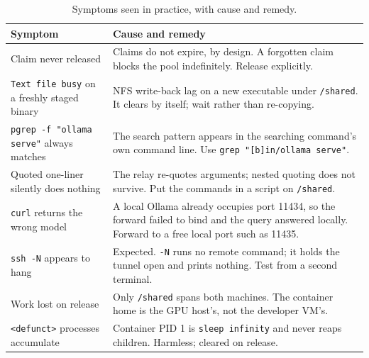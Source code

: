 \documentclass[11pt,a4paper]{article}
\newcommand{\cmd}[1]{\texttt{\small #1}}
\begin{document}
\begin{table}[!ht]
  \centering
  \renewcommand{\arraystretch}{1.25}
  \begin{tabularx}{\linewidth}{@{}>{\raggedright\arraybackslash}p{4.4cm} X@{}}
    \toprule
    \textbf{Symptom} & \textbf{Cause and remedy} \\\midrule
    Claim never released &
    Claims do not expire, by design. A forgotten claim blocks the pool
    indefinitely. Release explicitly. \\[2pt]

    \cmd{Text file busy} on a freshly staged binary &
    NFS write-back lag on a new executable under \cmd{/shared}. It clears by
    itself; wait rather than re-copying. \\[2pt]

    \cmd{pgrep -f "ollama serve"} always matches &
    The search pattern appears in the searching command's own command line.
    Use \cmd{grep "[b]in/ollama serve"}. \\[2pt]

    Quoted one-liner silently does nothing &
    The relay re-quotes arguments; nested quoting does not survive. Put the
    commands in a script on \cmd{/shared}. \\[2pt]

    \cmd{curl} returns the wrong model &
    A local Ollama already occupies port 11434, so the forward failed to bind
    and the query answered locally. Forward to a free local port such as
    11435. \\[2pt]

    \cmd{ssh -N} appears to hang &
    Expected. \cmd{-N} runs no remote command; it holds the tunnel open and
    prints nothing. Test from a second terminal. \\[2pt]

    Work lost on release &
    Only \cmd{/shared} spans both machines. The container home is the GPU
    host's, not the developer VM's. \\[2pt]

    \cmd{<defunct>} processes accumulate &
    Container PID 1 is \cmd{sleep infinity} and never reaps children.
    Harmless; cleared on release. \\\bottomrule
  \end{tabularx}
  \caption{Symptoms seen in practice, with cause and remedy.}
  \label{tab:gpu-pitfalls}
\end{table}

\end{document}
